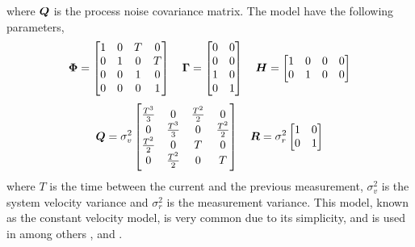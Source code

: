 where $\bm{Q}$ is the process noise covariance matrix. The model have the following parameters,
\begin{equation*}
\bm{\Phi} =	\begin{bmatrix}
1 & 0 & T & 0 \\
0 & 1 & 0 & T \\
0 & 0 & 1 & 0 \\
0 & 0 & 0 & 1 \\
\end{bmatrix} \quad
\bm{\Gamma} = \begin{bmatrix}
0 & 0 \\
0 & 0 \\
1 & 0 \\
0 & 1 \\
\end{bmatrix} \quad
\bm{H} = \begin{bmatrix}
1 & 0 & 0 & 0 \\
0 & 1 & 0 & 0 \\
\end{bmatrix}
\end{equation*}
\begin{equation*}
\bm{Q}	= \sigma_v^2 \begin{bmatrix}
\frac{T^3}{3} 	& 0 				& \frac{T^2}{2}	& 0 			\\
0 				& \frac{T^3}{3}  	& 0 			& \frac{T^2}{2}	\\
\frac{T^2}{2}	& 0					& T				& 0				\\
0				& \frac{T^2}{2}		& 0				& T				\\
\end{bmatrix} \quad
\bm{R} = \sigma_r^2 \begin{bmatrix}
1 & 0 \\
0 & 1 \\
\end{bmatrix}
\end{equation*}
where $T$ is the time between the current and the previous measurement, $\sigma_v^2$ is the system velocity variance and $\sigma_r^2$ is the measurement variance. This model, known as the constant velocity model,  is very common due to its simplicity, and is used in among others \cite{Reid1979}, \cite{Coraluppi2000} and \cite{Brekke2012}.

